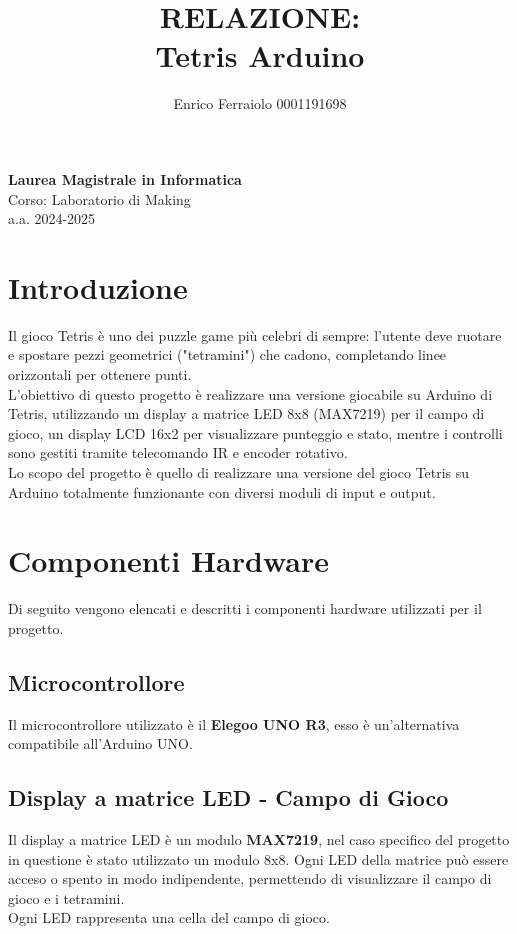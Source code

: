 \documentclass[a4paper, 12pt]{article}
\title{\textbf{RELAZIONE: \\ Tetris Arduino}}
\author{Enrico Ferraiolo 0001191698}
\date{}
\begin{document}
\maketitle

\begin{center}
    \textbf{Laurea Magistrale in Informatica}\\
    \vspace{0.3cm}
    Corso: Laboratorio di Making\\
    a.a. 2024-2025
    \vspace{2cm}
\end{center}

\newpage

\tableofcontents
\newpage

\section{Introduzione}
Il gioco Tetris è uno dei puzzle game più celebri di sempre: l'utente deve ruotare e spostare pezzi geometrici ("tetramini") che cadono,
completando linee orizzontali per ottenere punti.\\
L'obiettivo di questo progetto è realizzare una versione giocabile su Arduino di Tetris, utilizzando un display a matrice LED 8x8 (MAX7219)
per il campo di gioco, un display LCD 16x2 per visualizzare punteggio e stato, mentre i controlli sono gestiti tramite telecomando IR e encoder rotativo.\\
Lo scopo del progetto è quello di realizzare una versione del gioco Tetris su Arduino totalmente funzionante con diversi moduli di input e output.\\
\newpage

\section{Componenti Hardware}
Di seguito vengono elencati e descritti i componenti hardware utilizzati per il progetto.

\subsection{Microcontrollore}
Il microcontrollore utilizzato è il \textbf{Elegoo UNO R3}, esso è un'alternativa compatibile all'Arduino UNO.

\subsection{Display a matrice LED - Campo di Gioco}
Il display a matrice LED è un modulo \textbf{MAX7219}, nel caso specifico del progetto in questione è stato utilizzato un modulo 8x8.
Ogni LED della matrice può essere acceso o spento in modo indipendente, permettendo di visualizzare il campo di gioco e i tetramini.\\
Ogni LED rappresenta una cella del campo di gioco.
\end{document}
